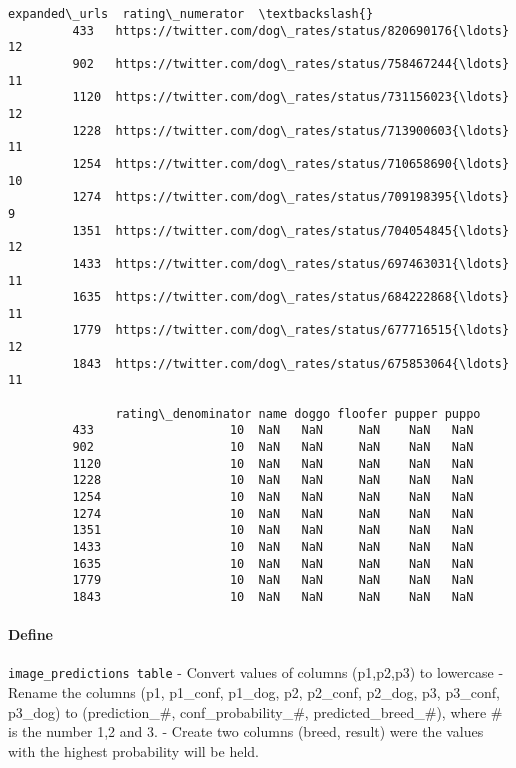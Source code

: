 \documentclass[11pt]{article}
\begin{document}
\begin{Verbatim}[commandchars=\\\{\}]
                                                   expanded\_urls  rating\_numerator  \textbackslash{}
         433   https://twitter.com/dog\_rates/status/820690176{\ldots}                12   
         902   https://twitter.com/dog\_rates/status/758467244{\ldots}                11   
         1120  https://twitter.com/dog\_rates/status/731156023{\ldots}                12   
         1228  https://twitter.com/dog\_rates/status/713900603{\ldots}                11   
         1254  https://twitter.com/dog\_rates/status/710658690{\ldots}                10   
         1274  https://twitter.com/dog\_rates/status/709198395{\ldots}                 9   
         1351  https://twitter.com/dog\_rates/status/704054845{\ldots}                12   
         1433  https://twitter.com/dog\_rates/status/697463031{\ldots}                11   
         1635  https://twitter.com/dog\_rates/status/684222868{\ldots}                11   
         1779  https://twitter.com/dog\_rates/status/677716515{\ldots}                12   
         1843  https://twitter.com/dog\_rates/status/675853064{\ldots}                11   
         
               rating\_denominator name doggo floofer pupper puppo  
         433                   10  NaN   NaN     NaN    NaN   NaN  
         902                   10  NaN   NaN     NaN    NaN   NaN  
         1120                  10  NaN   NaN     NaN    NaN   NaN  
         1228                  10  NaN   NaN     NaN    NaN   NaN  
         1254                  10  NaN   NaN     NaN    NaN   NaN  
         1274                  10  NaN   NaN     NaN    NaN   NaN  
         1351                  10  NaN   NaN     NaN    NaN   NaN  
         1433                  10  NaN   NaN     NaN    NaN   NaN  
         1635                  10  NaN   NaN     NaN    NaN   NaN  
         1779                  10  NaN   NaN     NaN    NaN   NaN  
         1843                  10  NaN   NaN     NaN    NaN   NaN  
\end{Verbatim}
            
    \paragraph{Define}\label{define}

\texttt{image\_predictions\ table} - Convert values of columns
(p1,p2,p3) to lowercase - Rename the columns (p1, p1\_conf, p1\_dog, p2,
p2\_conf, p2\_dog, p3, p3\_conf, p3\_dog) to (prediction\_\#,
conf\_probability\_\#, predicted\_breed\_\#), where \# is the number 1,2
and 3. - Create two columns (breed, result) were the values with the
highest probability will be held.
\end{document}
